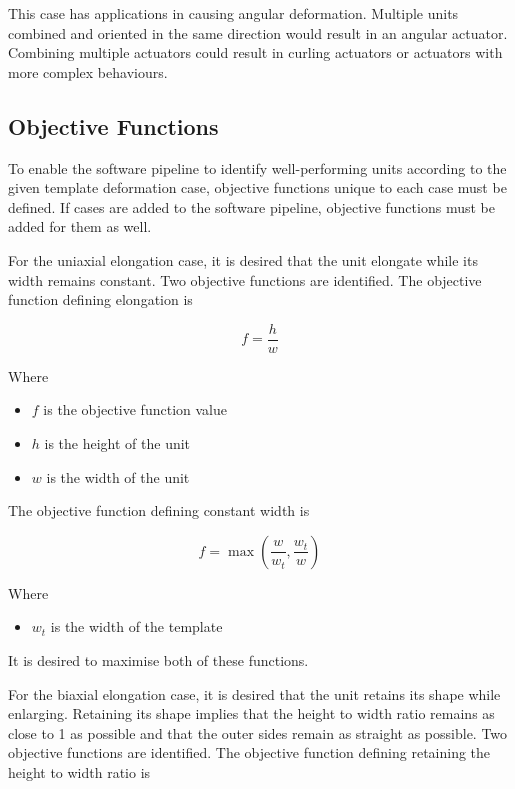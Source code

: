 This case has applications in causing angular deformation. Multiple units combined and oriented in the same direction would result in an angular actuator. Combining multiple actuators could result in curling actuators or actuators with more complex behaviours.

\subsection{Objective Functions}

To enable the software pipeline to identify well-performing units according to the given template deformation case, objective functions unique to each case must be defined. If cases are added to the software pipeline, objective functions must be added for them as well.

For the uniaxial elongation case, it is desired that the unit elongate while its width remains constant. Two objective functions are identified. The objective function defining elongation is

\begin{equation}
	f=\frac{h}{w}
\end{equation}

Where

\begin{itemize}
	\item $f$ is the objective function value
	\item $h$ is the height of the unit
	\item $w$ is the width of the unit
\end{itemize}

The objective function defining constant width is

\begin{equation}
	f=\max\left (\frac{w}{w_{t}},\frac{w_{t}}{w} \right )
\end{equation}

Where

\begin{itemize}
	\item $w_{t}$ is the width of the template
\end{itemize}

It is desired to maximise both of these functions.

For the biaxial elongation case, it is desired that the unit retains its shape while enlarging. Retaining its shape implies that the height to width ratio remains as close to 1 as possible and that the outer sides remain as straight as possible. Two objective functions are identified. The objective function defining retaining the height to width ratio is

